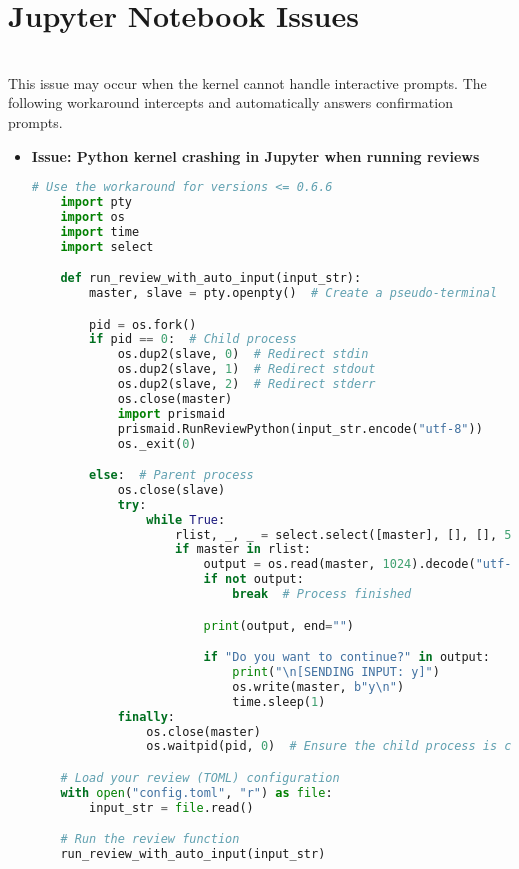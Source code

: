 \section{Jupyter Notebook Issues}
\\
This issue may occur when the kernel cannot handle interactive prompts. The following workaround intercepts and automatically answers confirmation prompts.
\begin{itemize}
    \item \textbf{Issue: Python kernel crashing in Jupyter when running reviews}

    \begin{commandbox}
    \begin{lstlisting}[language=Python]
    # Use the workaround for versions <= 0.6.6
    import pty
    import os
    import time
    import select

    def run_review_with_auto_input(input_str):
        master, slave = pty.openpty()  # Create a pseudo-terminal

        pid = os.fork()
        if pid == 0:  # Child process
            os.dup2(slave, 0)  # Redirect stdin
            os.dup2(slave, 1)  # Redirect stdout
            os.dup2(slave, 2)  # Redirect stderr
            os.close(master)
            import prismaid
            prismaid.RunReviewPython(input_str.encode("utf-8"))
            os._exit(0)

        else:  # Parent process
            os.close(slave)
            try:
                while True:
                    rlist, _, _ = select.select([master], [], [], 5)
                    if master in rlist:
                        output = os.read(master, 1024).decode("utf-8", errors="ignore")
                        if not output:
                            break  # Process finished

                        print(output, end="")

                        if "Do you want to continue?" in output:
                            print("\n[SENDING INPUT: y]")
                            os.write(master, b"y\n")
                            time.sleep(1)
            finally:
                os.close(master)
                os.waitpid(pid, 0)  # Ensure the child process is cleaned up

    # Load your review (TOML) configuration
    with open("config.toml", "r") as file:
        input_str = file.read()

    # Run the review function
    run_review_with_auto_input(input_str)
    \end{lstlisting}
    \end{commandbox}
\end{itemize}

